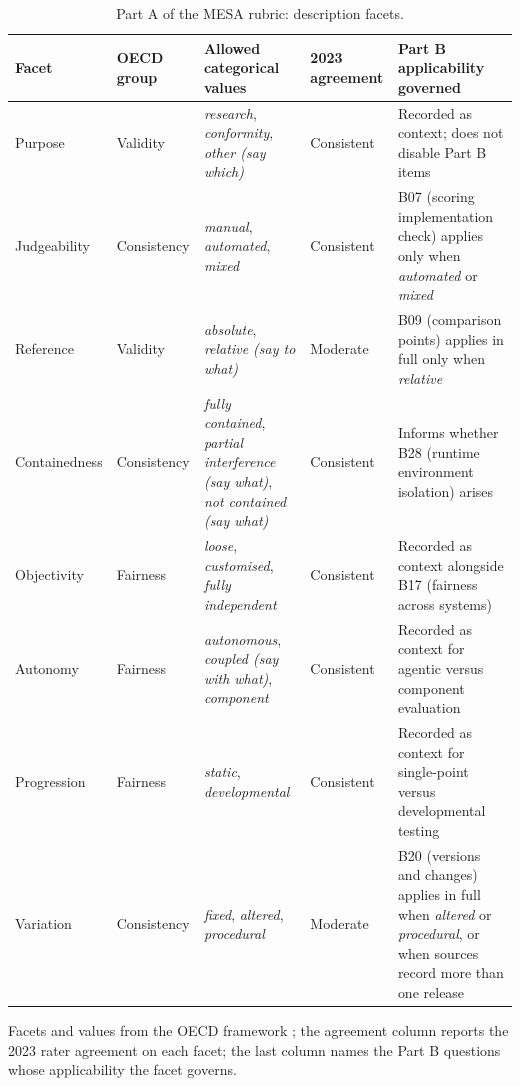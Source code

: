 \documentclass[10pt,conference]{IEEEtran}
\begin{document}
\begin{table}[t]
\caption{Part A of the MESA rubric: description facets.}
\label{tab:rubric-a}
\centering
\small
\begin{tabularx}{\textwidth}{@{}llXlX@{}}
\toprule
\textbf{Facet} & \textbf{OECD group} & \textbf{Allowed categorical values} & \textbf{2023 agreement} & \textbf{Part B applicability governed} \\
\midrule
Purpose & Validity & \emph{research}, \emph{conformity}, \emph{other (say which)} & Consistent & Recorded as context; does not disable Part B items \\
Judgeability & Consistency & \emph{manual}, \emph{automated}, \emph{mixed} & Consistent & B07 (scoring implementation check) applies only when \emph{automated} or \emph{mixed} \\
Reference & Validity & \emph{absolute}, \emph{relative (say to what)} & Moderate & B09 (comparison points) applies in full only when \emph{relative} \\
Containedness & Consistency & \emph{fully contained}, \emph{partial interference (say what)}, \emph{not contained (say what)} & Consistent & Informs whether B28 (runtime environment isolation) arises \\
Objectivity & Fairness & \emph{loose}, \emph{customised}, \emph{fully independent} & Consistent & Recorded as context alongside B17 (fairness across systems) \\
Autonomy & Fairness & \emph{autonomous}, \emph{coupled (say with what)}, \emph{component} & Consistent & Recorded as context for agentic versus component evaluation \\
Progression & Fairness & \emph{static}, \emph{developmental} & Consistent & Recorded as context for single-point versus developmental testing \\
Variation & Consistency & \emph{fixed}, \emph{altered}, \emph{procedural} & Moderate & B20 (versions and changes) applies in full when \emph{altered} or \emph{procedural}, or when sources record more than one release \\
\bottomrule
\end{tabularx}
\par\vspace{2pt}\raggedright\footnotesize Facets and values from the OECD framework \cite{cohn_hernandez_orallo_oecd_2023}; the agreement column reports the 2023 rater agreement on each facet; the last column names the Part B questions whose applicability the facet governs.
\end{table}
\end{document}
